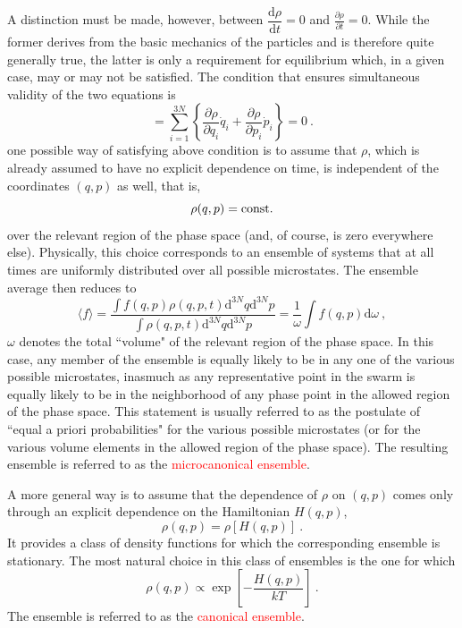 \documentclass[12pt,a4paper]{article}
\newcommand{\dif}{\mathrm{d}}
\begin{document}
A distinction must be made, however, between $\dfrac{\dif \rho}{\dif t} = 0$ and $\frac{\partial \rho}{\partial t} = 0$. While the former derives from the basic mechanics of the particles and is therefore quite generally true, the latter is only a requirement for equilibrium which, in a given case, may or may not be satisfied. The condition that ensures simultaneous validity of the two equations is 
\begin{equation}
[\rho, H]  = \sum_{i=1}^{3N} \left\{\dfrac{\partial \rho}{\partial q_i} \dot{q}_i +\dfrac{\partial \rho}{\partial p_i} \dot{p}_i\right\} = 0 ~.
\end{equation}
one possible way of satisfying above condition is to assume that $\rho$, which is already assumed to have no explicit dependence on time, is independent of the coordinates $(q,p)$ as well, that is,
\begin{equation}
\rho(q,p) = \rm const.
\end{equation}
over the relevant region of the phase space (and, of course, is zero everywhere else). Physically, this choice corresponds to an ensemble of systems that at all times are uniformly distributed over all possible microstates. The ensemble average then reduces to 
\begin{equation}
\langle f\rangle = \dfrac{\int f(q, p) \rho(q, p, t) \dif^{3N} q \dif^{3N} p}{\int \rho(q, p, t) \dif^{3N} q \dif^{3N} p} = \dfrac{1}{\omega} \int f(q, p)  \dif \omega ~,
\end{equation}
$\omega$ denotes the total ``volume" of the relevant region of the phase space. In this case, any member of the ensemble is equally likely to be in any one of the various possible microstates, inasmuch as any representative point in the swarm is equally likely to be in the neighborhood of any phase point in the allowed region of the phase space. This statement is usually referred to as the postulate of ``equal a priori probabilities" for the various possible microstates (or for the various volume elements in the allowed region of the phase space). The resulting ensemble is referred to as the \textcolor{red}{microcanonical ensemble}.

A more general way is to assume that the dependence of $\rho$ on $(q,p)$ comes only through an explicit dependence on the Hamiltonian $H(q,p)$, 
\begin{equation}
\rho(q,p) = \rho[H(q,p)] ~.
\end{equation}
It provides a class of density functions for which the corresponding ensemble is stationary. The most natural choice in this class of ensembles is the one for which
\begin{equation}
\rho(q,p) \propto \exp \left[-\dfrac{H(q,p)}{kT} \right] ~.
\end{equation}
The ensemble is referred to as the \textcolor{red}{canonical ensemble}.
\end{document}
